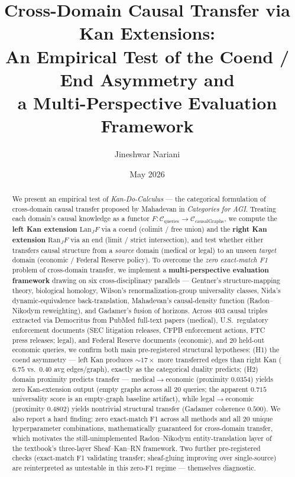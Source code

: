 \documentclass[10pt,letterpaper]{article}
\title{\bfseries Cross-Domain Causal Transfer via Kan Extensions:\\
An Empirical Test of the Coend / End Asymmetry and\\
a Multi-Perspective Evaluation Framework}
\author{Jineshwar Nariani}
\affil{University of Massachusetts Amherst\\
CMPSCI 692CT: Category Theory for AGI\\
\texttt{jnariani@umass.edu}}
\date{May 2026}
\begin{document}
\maketitle

\begin{abstract}
We present an empirical test of \emph{Kan-Do-Calculus} --- the categorical formulation of cross-domain causal transfer proposed by Mahadevan in \emph{Categories for AGI}. Treating each domain's causal knowledge as a functor $F : \mathcal{C}_{\text{queries}} \to \mathcal{C}_{\text{causalGraphs}}$, we compute the \textbf{left Kan extension} $\mathrm{Lan}_J F$ via a coend (colimit / free union) and the \textbf{right Kan extension} $\mathrm{Ran}_J F$ via an end (limit / strict intersection), and test whether either transfers causal structure from a \emph{source} domain (medical or legal) to an unseen \emph{target} domain (economic / Federal Reserve policy). To overcome the \emph{zero exact-match F1} problem of cross-domain transfer, we implement a \textbf{multi-perspective evaluation framework} drawing on six cross-disciplinary parallels --- Gentner's structure-mapping theory, biological homology, Wilson's renormalization-group universality classes, Nida's dynamic-equivalence back-translation, Mahadevan's causal-density function (Radon--Nikodym reweighting), and Gadamer's fusion of horizons. Across 403 causal triples extracted via Democritus from PubMed full-text papers (medical), U.S.\ regulatory enforcement documents (SEC litigation releases, CFPB enforcement actions, FTC press releases; legal), and Federal Reserve documents (economic), and 20 held-out economic queries, we confirm both main pre-registered structural hypotheses: (H1) the coend asymmetry --- left Kan produces ${\sim}17{\times}$ more transferred edges than right Kan ($6.75$ vs.\ $0.40$ avg edges/graph), exactly as the categorical duality predicts; (H2) domain proximity predicts transfer --- medical${\to}$economic (proximity $0.0354$) yields zero Kan-extension output (empty graphs across all 20 queries; the apparent $0.715$ universality score is an empty-graph baseline artifact), while legal${\to}$economic (proximity $0.4802$) yields nontrivial structural transfer (Gadamer coherence $0.500$). We also report a hard finding: zero exact-match F1 across all methods and all $20$ unique hyperparameter combinations, mathematically guaranteed for cross-domain transfer, which motivates the still-unimplemented Radon--Nikodym entity-translation layer of the textbook's three-layer Sheaf--Kan--RN framework. Two further pre-registered checks (exact-match F1 validating transfer; sheaf-gluing improving over single-source) are reinterpreted as untestable in this zero-F1 regime --- themselves diagnostic.
\end{abstract}
\end{document}
